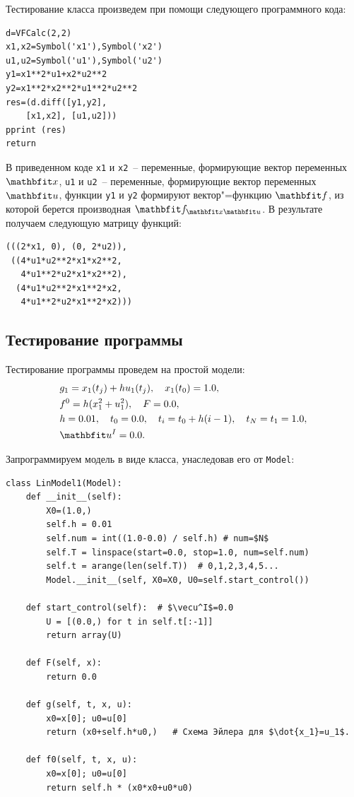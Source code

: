 \documentclass[a4paper,14pt, openany, twoside, final]{extbook} %
\begin{document}
Тестирование класса произведем при помощи следующего программного кода:

\begin{verbatim}
d=VFCalc(2,2)
x1,x2=Symbol('x1'),Symbol('x2')
u1,u2=Symbol('u1'),Symbol('u2')
y1=x1**2*u1+x2*u2**2
y2=x1**2*x2**2*u1**2*u2**2
res=(d.diff([y1,y2],
    [x1,x2], [u1,u2]))
pprint (res)
return
\end{verbatim}

В приведенном коде \texttt{x1} и \texttt{x2}~-- переменные, формирующие вектор переменных $\vecx$, \texttt{u1} и \texttt{u2}~-- переменные, формирующие вектор переменных $\vecu$, функции \texttt{y1} и \texttt{y2} формируют вектор"=функцию $\vecf$, из которой берется производная $\vecf_{\vecx\vecu}$.  В результате получаем следующую матрицу функций:
\begin{verbatim}
(((2*x1, 0), (0, 2*u2)),
 ((4*u1*u2**2*x1*x2**2,
   4*u1**2*u2*x1*x2**2),
  (4*u1*u2**2*x1**2*x2,
   4*u1**2*u2*x1**2*x2)))
\end{verbatim}

\subsection{Тестирование программы}
\label{sec:testing}

Тестирование программы проведем на простой модели:
\begin{align*}
  &g_1=x_1(t_j)+hu_1(t_j),\quad x_1(t_0)=1.0,\\
  &f^0=h(x_1^2+u_1^2),\quad F=0.0, \\
  &h=0.01,\quad t_0=0.0, \quad t_i=t_0+h(i-1),\quad t_N=t_1=1.0,\\
  &\vecu^I=0.0.
\end{align*}

Запрограммируем модель в виде класса, унаследовав его от \texttt{Model}:
\begin{verbatim}
class LinModel1(Model):
    def __init__(self):
        X0=(1.0,)
        self.h = 0.01
        self.num = int((1.0-0.0) / self.h) # num=$N$
        self.T = linspace(start=0.0, stop=1.0, num=self.num)
        self.t = arange(len(self.T))  # 0,1,2,3,4,5...
        Model.__init__(self, X0=X0, U0=self.start_control())

    def start_control(self):  # $\vecu^I$=0.0
        U = [(0.0,) for t in self.t[:-1]]
        return array(U)

    def F(self, x):
        return 0.0

    def g(self, t, x, u):
        x0=x[0]; u0=u[0]
        return (x0+self.h*u0,)   # Схема Эйлера для $\dot{x_1}=u_1$.

    def f0(self, t, x, u):
        x0=x[0]; u0=u[0]
        return self.h * (x0*x0+u0*u0)
\end{verbatim}
\end{document}
